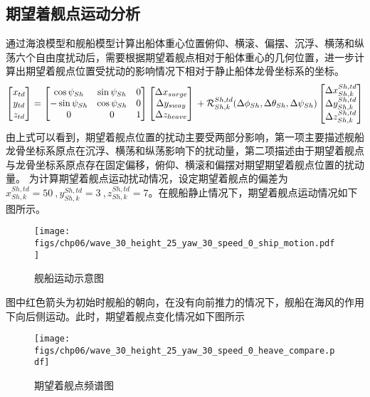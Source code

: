 \subsection{期望着舰点运动分析}
通过海浪模型和舰船模型计算出船体重心位置俯仰、横滚、偏摆、沉浮、横荡和纵荡六个自由度扰动后，需要根据期望着舰点相对于船体重心的几何位置，进一步计算出期望着舰点位置受扰动的影响情况下相对于静止船体龙骨坐标系的坐标。
\begin{equation}
\begin{bmatrix}  x_{td} \\ y_{td} \\z_{td} \end{bmatrix} = \begin{bmatrix}	\cos \psi_{Sh} & \sin \psi_{Sh}  & 0     \\	 -\sin \psi_{Sh} & \cos \psi_{Sh}   & 0 \\ 	0   & 0 & 1 \end{bmatrix} \begin{bmatrix} \Delta x_{surge} \\ \Delta y_{sway} \\ \Delta z_{heave} \end{bmatrix} \\+ \mathcal{R}_{Sh,k}^{Sh,td}(\Delta \phi_{Sh}, \Delta \theta_{Sh}, \Delta \psi_{Sh}) \begin{bmatrix} \Delta x_{Sh,k}^{Sh,td} \\ \Delta y_{Sh,k}^{Sh,td} \\ \Delta z_{Sh,k}^{Sh,td} \end{bmatrix}
\end{equation}
由上式可以看到，期望着舰点位置的扰动主要受两部分影响，第一项主要描述舰船龙骨坐标系原点在沉浮、横荡和纵荡影响下的扰动量，第二项描述由于期望着舰点与龙骨坐标系原点存在固定偏移，俯仰、横滚和偏摆对期望期望着舰点位置的扰动量。
为计算期望着舰点运动扰动情况，设定期望着舰点的偏差为$x_{Sh,k}^{Sh,td} =50\ , y_{Sh,k}^{Sh,td}= 3\ ,z_{Sh,k}^{Sh,td}=7$。在舰船静止情况下，期望着舰点运动情况如下图所示。
 \begin{figure}[!ht]
	\centering
	\texttt{[image: figs/chp06/wave\_30\_height\_25\_yaw\_30\_speed\_0\_ship\_motion.pdf]}	
	\caption{舰船运动示意图}
	\label{fig:wave_30_height_25_yaw_30_speed_0_ship_motion}
\end{figure}
图中红色箭头为初始时舰船的朝向，在没有向前推力的情况下，舰船在海风的作用下向后侧运动。此时，期望着舰点变化情况如下图所示
 \begin{figure}[!ht]
	\centering
	\texttt{[image: figs/chp06/wave\_30\_height\_25\_yaw\_30\_speed\_0\_heave\_compare.pdf]}	
	\caption{期望着舰点频谱图}
	\label{fig:wave_30_height_25_yaw_30_speed_0_heave_compare}
\end{figure}

